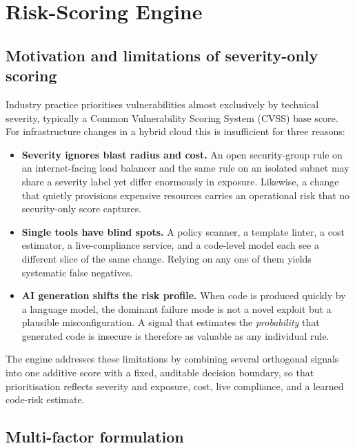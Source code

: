 \section{Risk-Scoring Engine}
\label{sec:risk-scoring}

\subsection{Motivation and limitations of severity-only scoring}
\label{subsec:rs-motivation}

Industry practice prioritises vulnerabilities almost exclusively by technical severity,
typically a Common Vulnerability Scoring System (CVSS) base score. For infrastructure
changes in a hybrid cloud this is insufficient for three reasons:

\begin{itemize}
    \item \textbf{Severity ignores blast radius and cost.} An open security-group rule on
    an internet-facing load balancer and the same rule on an isolated subnet may share a
    severity label yet differ enormously in exposure. Likewise, a change that quietly
    provisions expensive resources carries an operational risk that no security-only
    score captures.
    \item \textbf{Single tools have blind spots.} A policy scanner, a template linter, a
    cost estimator, a live-compliance service, and a code-level model each see a
    different slice of the same change. Relying on any one of them yields systematic
    false negatives.
    \item \textbf{AI generation shifts the risk profile.} When code is produced quickly
    by a language model, the dominant failure mode is not a novel exploit but a plausible
    misconfiguration. A signal that estimates the \emph{probability} that generated code
    is insecure is therefore as valuable as any individual rule.
\end{itemize}

The engine addresses these limitations by combining several orthogonal signals into one
additive score with a fixed, auditable decision boundary, so that prioritisation reflects
severity and exposure, cost, live compliance, and a learned code-risk estimate.

\subsection{Multi-factor formulation}
\label{subsec:rs-formulation}

